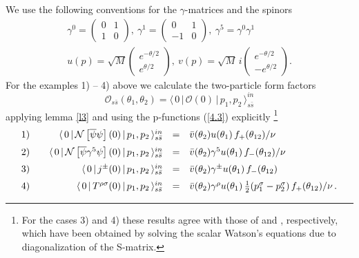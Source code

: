 \documentclass[a4paper,a4paper]{article}
\begin{document}
We use the following conventions for the $\gamma $-matrices and the spinors 
\begin{gather*}
\gamma ^{0}=\left( 
\begin{array}{cc}
0 & 1 \\ 
1 & 0
\end{array}
\right) ,~\gamma ^{1}=\left( 
\begin{array}{cc}
0 & 1 \\ 
-1 & 0
\end{array}
\right) ,~\gamma ^{5}=\gamma ^{0}\gamma ^{1} \\
u(p)=\sqrt{M}\left( 
\begin{array}{c}
e^{-\theta /2} \\ 
e^{\theta /2}
\end{array}
\right) ,~v(p)=\sqrt{M}\,i\left( 
\begin{array}{c}
e^{-\theta /2} \\ 
-e^{\theta /2}
\end{array}
\right) .
\end{gather*}
For the examples 1) -- 4) above we calculate the two-particle form factors 
\[
\mathcal{O}_{s\bar{s}}(\theta _{1},\theta _{2})=\langle \,0\,|\,\mathcal{O}%
(0)\,|\,p_{1},p_{2}\,\rangle _{s\bar{s}}^{in} 
\]
applying lemma \ref{l3} and using the p-functions (\ref{4.3}) explicitly%
\footnote{%
For the cases 3) and 4) these results agree with those of \cite{W} and \cite
{Sm}, respectively, which have been obtained by solving the scalar Watson's
equations due to diagonalization of the S-matrix.} 
\begin{equation}
\begin{array}{llrcl}
1) &  & \langle \,0\,|\,\mathcal{N}\left[ \overline{\psi }\psi \right]
(0)\,|\,p_{1},p_{2}\,\rangle _{s\bar{s}}^{in} & = & \bar{v}(\theta
_{2})u(\theta _{1})\,f_{+}(\theta _{12})/\nu \\[2mm] 
2) &  & \langle \,0\,|\,\mathcal{N}\left[ \overline{\psi }\gamma ^{5}\psi
\right] (0)\,|\,p_{1},p_{2}\,\rangle _{s\bar{s}}^{in} & = & \bar{v}(\theta
_{2})\gamma ^{5}u(\theta _{1})\,f_{-}(\theta _{12})/\nu \\[2mm] 
3) &  & \langle \,0\,|\,j^{\pm }(0)\,|\,p_{1},p_{2}\,\rangle _{s\bar{s}}^{in}
& = & \bar{v}(\theta _{2})\gamma ^{\pm }u(\theta _{1})\,f_{-}(\theta _{12})
\\[2mm] 
4) &  & \langle \,0\,|\,T^{\rho \sigma }(0)\,|\,p_{1},p_{2}\,\rangle _{s\bar{%
s}}^{in} & = & \bar{v}(\theta _{2})\gamma ^{\rho }u(\theta _{1})\,\tfrac{1}{2%
}(p_{1}^{\sigma }-p_{2}^{\sigma })\,f_{+}(\theta _{12})/\nu \,.
\end{array}
\label{4.5}
\end{equation}
\end{document}
